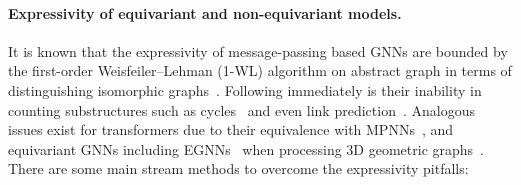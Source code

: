 \documentclass{article}
\theoremstyle{plain}
\theoremstyle{definition}
\theoremstyle{remark}
\newcommand{\1}{\mathbf{1}}
\begin{document}
\paragraph{Expressivity of equivariant and non-equivariant models.} It is known that the expressivity of message-passing based GNNs are bounded by the first-order Weisfeiler–Lehman (1-WL) algorithm on abstract graph in terms of distinguishing isomorphic graphs~\citep{HowPowerfulGNN}. Following immediately is their inability in counting substructures such as cycles~\citep{I2GNN} and even link prediction~\citep{zhang2021labeling}. Analogous issues exist for transformers due to their equivalence with MPNNs~\citep{cai2023connection}, and equivariant GNNs including EGNNs~\citep{satorras2021n} when processing 3D geometric graphs~\citep{li2024distance,li2024completeness}. There are some main stream methods to overcome the expressivity pitfalls:
\end{document}
